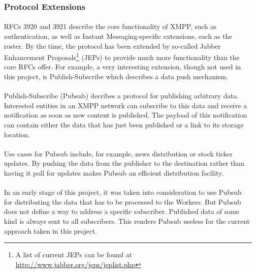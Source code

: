\subsubsection{Protocol Extensions}
\paragraph{}
RFCs 3920 and 3921 describe the core functionality of XMPP, such as authentication, as well as Instant Messaging-specific extensions, such as the roster. By the time, the protocol has been extended by so-called Jabber Enhancement Proposals\footnote{A list of current JEPs can be found at \href{http://www.jabber.org/jeps/jeplist.php}{http://www.jabber.org/jeps/jeplist.php}} (JEPs) to provide much more functionality than the core RFCs offer. For example, a very interesting extension, though not used in this project, is Publish-Subscribe \cite{jep0060} which describes a data push mechanism.

\paragraph{}
Publish-Subscribe (Pubsub) decribes a protocol for publishing arbitrary data. Interested entities in an XMPP network can subscribe to this data and receive a notification as soon as new content is published. The payload of this notification can contain either the data that has just been published or a link to its storage location.

\paragraph{}
Use cases for Pubsub include, for example, news distribution or stock ticker updates. By pushing the data from the publisher to the destination rather than having it poll for updates makes Pubsub an efficient distribution facility.

\paragraph{}
In an early stage of this project, it was taken into consideration to use Pubsub for distributing the data that has to be processed to the Workers. But Pubsub does not define a way to address a specific subscriber. Published data of some kind is always sent to all subscribers. This renders Pubsub useless for the current approach taken in this project.
